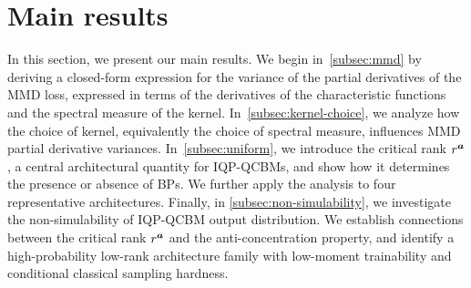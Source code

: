 \documentclass{article}
\theoremstyle{plain}
\theoremstyle{definition}
\theoremstyle{remark}
\begin{document}
\section{Main results} \label{sec:main-result}
In this section, we present our main results. We begin in~\cref{subsec:mmd} by deriving a closed-form expression for the variance of the partial derivatives of the MMD loss, expressed in terms of the derivatives of the characteristic functions and the spectral measure of the kernel.
In~\cref{subsec:kernel-choice}, we analyze how the choice of kernel, equivalently the choice of spectral measure, influences MMD partial derivative variances.
In~\cref{subsec:uniform}, we introduce the critical rank $r^{\bm{a}}$, a central architectural quantity for IQP-QCBMs, and show how it determines the presence or absence of BPs. We further apply the analysis to four representative architectures. 
Finally, in \cref{subsec:non-simulability}, we investigate the non-simulability of IQP-QCBM output distribution. 
We establish connections between the critical rank $r^{\bm{a}}$ and the anti-concentration property, and identify a high-probability low-rank architecture family with low-moment trainability and conditional classical sampling hardness.
\end{document}
